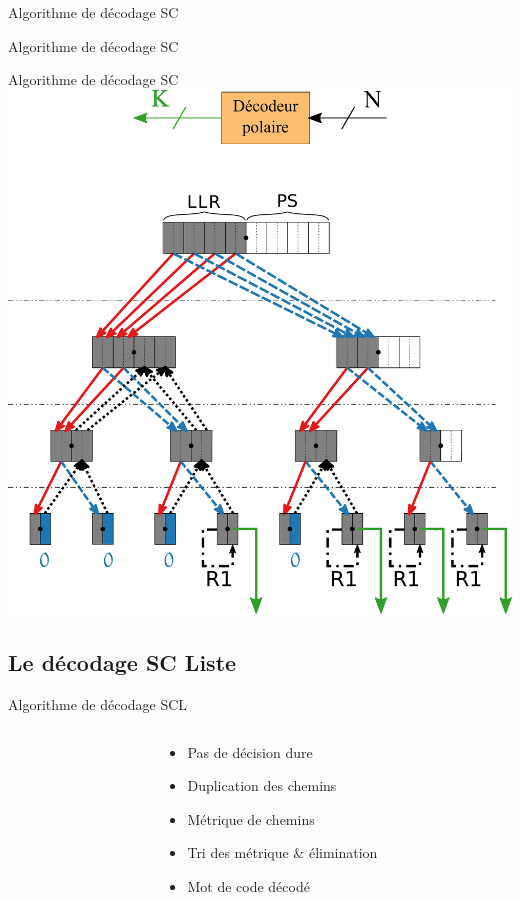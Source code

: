 \documentclass[t,compress,mathserif,12pt,xcolor=dvipsnames]{beamer}
\begin{document}
\begin{frame}[c]{Algorithme de décodage SC}
\end{frame}

\begin{frame}[c]{Algorithme de décodage SC}
\end{frame}

\begin{frame}[c]{Algorithme de décodage SC}
	\includegraphics[width=.5\textwidth]{fig/sc_tree_output.pdf}
\end{frame}

\subsection*{Le décodage SC Liste}

\begin{frame}[c]{Algorithme de décodage SCL}
	\begin{columns}[T] %

		\begin{column}{.7\textwidth}


		\end{column}

		\begin{column}{.3\textwidth}
			\begin{itemize}
				\item<3-> Pas de décision dure
				\item<4-> Duplication des chemins
				\item<5-> Métrique de chemins
				\item<6-> Tri des métrique \& élimination
				\item<7-> Mot de code décodé
			\end{itemize}
		\end{column}

	\end{columns}
\end{frame}
\end{document}
